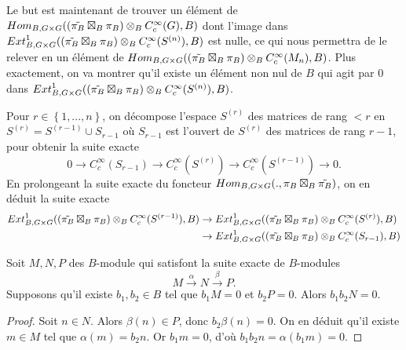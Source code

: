 Le but est maintenant de trouver un élément de $\operatorname{\mathnormal{Hom}}_{B, G \times G}((\tilde{\pi_B} \boxtimes_B \pi_B) \otimes_B C^\infty_c(G), B)$ dont l'image dans $\operatorname{\mathnormal{Ext}}^1_{B, G \times G}((\tilde{\pi_B} \boxtimes_B \pi_B) \otimes_B C^\infty_c(S^{(n)}), B)$ est nulle, ce qui nous permettra de le relever en un élément de $\operatorname{\mathnormal{Hom}}_{B, G \times G}((\tilde{\pi_B} \boxtimes_B \pi_B) \otimes_B C^\infty_c(M_n), B)$. Plus exactement, on va montrer qu'il existe un élément non nul de $B$ qui agit par $0$ dans $\operatorname{\mathnormal{Ext}}^1_{B, G \times G}((\tilde{\pi_B} \boxtimes_B \pi_B) \otimes_B C^\infty_c(S^{(n)}), B)$.

Pour $r \in \left\lbrace 1, ..., n \right\rbrace$, on décompose l'espace $S^{(r)}$ des matrices de rang $< r$ en $S^{(r)}=S^{(r-1)} \cup S_{r-1}$ où $S_{r-1}$ est l'ouvert de $S^{(r)}$ des matrices de rang $r-1$, pour obtenir la suite exacte
\begin{equation}
0 \rightarrow C^\infty_c(S_{r-1}) \rightarrow C^\infty_c(S^{(r)}) \rightarrow C^\infty_c(S^{(r-1)}) \rightarrow 0.
\end{equation}
En prolongeant la suite exacte du foncteur $\operatorname{\mathnormal{Hom}}_{B, G \times G} (., \pi_B \boxtimes_B \tilde{\pi_B})$, on en déduit la suite exacte
\begin{equation}
\begin{split}
\operatorname{\mathnormal{Ext}}^1_{B, G \times G}((\tilde{\pi_B} \boxtimes_B \pi_B) \otimes_B C^\infty_c(S^{(r-1)}), B) &\rightarrow \operatorname{\mathnormal{Ext}}^1_{B, G \times G}((\tilde{\pi_B} \boxtimes_B \pi_B) \otimes_B C^\infty_c(S^{(r)}), B) \\ 
&\rightarrow \operatorname{\mathnormal{Ext}}^1_{B, G \times G}((\tilde{\pi_B} \boxtimes_B \pi_B) \otimes_B C^\infty_c(S_{r-1}), B)
\end{split}
\end{equation}

\begin{lemme}
Soit $M,N,P$ des $B$-module qui satisfont la suite exacte de $B$-modules
\begin{equation}
M \xrightarrow{\alpha} N \xrightarrow{\beta} P.
\end{equation}
Supposons qu'il existe $b_1, b_2 \in B$ tel que $b_1M = 0$ et $b_2P=0$. Alors $b_1b_2N=0$.
\end{lemme}

\begin{proof}
Soit $n \in N$. Alors $\beta(n) \in P$, donc $b_2\beta(n)=0$. On en déduit qu'il existe $m \in M$ tel que $\alpha(m)=b_2n$. Or $b_1m=0$, d'où $b_1b_2n=\alpha(b_1m)=0$.
\end{proof}

